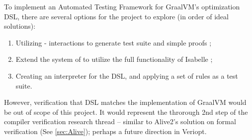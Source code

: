 To implement an Automated Testing Framework for GraalVM's optimization DSL, there are several options for the project to explore 
(in order of ideal solutions):
\begin{enumerate}
    \item Utilizing  -  interactions \cite[Ch. 4]{isabelleSystem} to generate test suite and simple proofs 
          \cite{isabelleQuickcheck,isabelleProof,isabelleNitpick,isabelleSledgehammer};
    \item Extend the system of  to utilize the full functionality of Isabelle \cite[Ch. 5]{isabelleSystem};
    \item Creating an interpreter for the DSL, and applying a set of rules as a test suite.
\end{enumerate}

However, verification that DSL matches the implementation of GraalVM would be out of scope of this project. It would represent the throrough 
2nd step of the compiler verification research thread \cite[pp. 5]{CompilerOptimization} -- similar to Alive2's \cite{Alive2} solution on formal 
verification (See \ref{sec:Alive}); perhaps a future direction in Veriopt.


